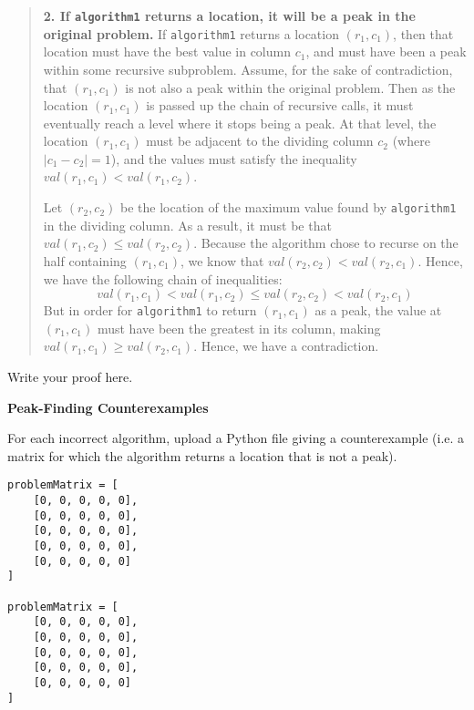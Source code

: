 \documentclass[12pt,twoside]{article}
\begin{document}
\begin{exercises}
\begin{quote}
{\bf 2. If \texttt{algorithm1} returns a location,
it will be a peak in the original problem.}
If \texttt{algorithm1} returns a location $(r_1, c_1)$,
then that location must have the best value in column $c_1$,
and must have been a peak within some recursive subproblem.
Assume, for the sake of contradiction,
that $(r_1, c_1)$ is not also a peak within the original problem.
Then as the location $(r_1, c_1)$ is passed up the chain of recursive calls,
it must eventually reach a level where it stops being a peak.
At that level, the location $(r_1, c_1)$
must be adjacent to the dividing column $c_2$ (where $|c_1 - c_2| = 1$),
and the values must satisfy the inequality
$val(r_1, c_1) < val(r_1, c_2)$.

Let $(r_2, c_2)$ be
the location of the maximum value found by \texttt{algorithm1}
in the dividing column.
As a result, it must be that $val(r_1, c_2) \le val(r_2, c_2)$.
Because the algorithm chose to recurse
on the half containing $(r_1, c_1)$,
we know that $val(r_2, c_2) < val(r_2, c_1)$.
Hence, we have the following chain of inequalities:
$$val(r_1, c_1) < val(r_1, c_2) \le val(r_2, c_2) < val(r_2, c_1)$$
But in order for \texttt{algorithm1} to return $(r_1, c_1)$ as a peak,
the value at $(r_1, c_1)$ must have been the greatest in its column,
making $val(r_1, c_1) \ge val(r_2, c_1)$.
Hence, we have a contradiction.
\end{quote}

\ifsolution \solution{}
Write your proof here.
\fi

\problem {} \textbf{Peak-Finding Counterexamples}

For each incorrect algorithm,
upload a Python file giving a counterexample
(i.e. a matrix for which the algorithm returns a location
that is not a peak).

\ifsolution \solution{}
\begin{verbatim}
problemMatrix = [
    [0, 0, 0, 0, 0],
    [0, 0, 0, 0, 0],
    [0, 0, 0, 0, 0],
    [0, 0, 0, 0, 0],
    [0, 0, 0, 0, 0]
]

problemMatrix = [
    [0, 0, 0, 0, 0],
    [0, 0, 0, 0, 0],
    [0, 0, 0, 0, 0],
    [0, 0, 0, 0, 0],
    [0, 0, 0, 0, 0]
]
\end{verbatim}
\fi

\end{exercises}
\end{document}
